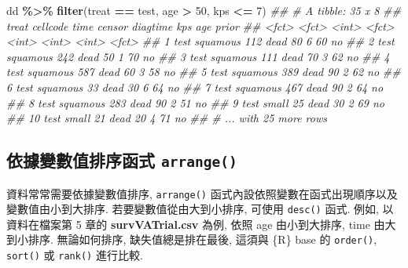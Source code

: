 \documentclass[
]{book}
\newenvironment{Shaded}{\begin{snugshade}}{\end{snugshade}}
\newcommand{\CommentTok}[1]{\textcolor[rgb]{0.56,0.35,0.01}{\textit{#1}}}
\newcommand{\DecValTok}[1]{\textcolor[rgb]{0.00,0.00,0.81}{#1}}
\newcommand{\KeywordTok}[1]{\textcolor[rgb]{0.13,0.29,0.53}{\textbf{#1}}}
\newcommand{\NormalTok}[1]{#1}
\newcommand{\OperatorTok}[1]{\textcolor[rgb]{0.81,0.36,0.00}{\textbf{#1}}}
\newcommand{\StringTok}[1]{\textcolor[rgb]{0.31,0.60,0.02}{#1}}
\begin{document}
\begin{Shaded}
\begin{Highlighting}[]
\NormalTok{dd }\OperatorTok{\%\textgreater{}\%}\StringTok{ }
\StringTok{  }\KeywordTok{filter}\NormalTok{(treat }\OperatorTok{==}\StringTok{ \textquotesingle{}test\textquotesingle{}}\NormalTok{, age }\OperatorTok{\textgreater{}}\StringTok{ }\DecValTok{50}\NormalTok{, kps }\OperatorTok{\textless{}=}\StringTok{ }\DecValTok{7}\NormalTok{)}
\CommentTok{\#\# \# A tibble: 35 x 8}
\CommentTok{\#\#    treat cellcode  time censor diagtime   kps   age prior}
\CommentTok{\#\#    \textless{}fct\textgreater{} \textless{}fct\textgreater{}    \textless{}int\textgreater{} \textless{}fct\textgreater{}     \textless{}int\textgreater{} \textless{}int\textgreater{} \textless{}int\textgreater{} \textless{}fct\textgreater{}}
\CommentTok{\#\#  1 test  squamous   112 dead         80     6    60 no   }
\CommentTok{\#\#  2 test  squamous   242 dead         50     1    70 no   }
\CommentTok{\#\#  3 test  squamous   111 dead         70     3    62 no   }
\CommentTok{\#\#  4 test  squamous   587 dead         60     3    58 no   }
\CommentTok{\#\#  5 test  squamous   389 dead         90     2    62 no   }
\CommentTok{\#\#  6 test  squamous    33 dead         30     6    64 no   }
\CommentTok{\#\#  7 test  squamous   467 dead         90     2    64 no   }
\CommentTok{\#\#  8 test  squamous   283 dead         90     2    51 no   }
\CommentTok{\#\#  9 test  small       25 dead         30     2    69 no   }
\CommentTok{\#\# 10 test  small       21 dead         20     4    71 no   }
\CommentTok{\#\# \# ... with 25 more rows}
\end{Highlighting}
\end{Shaded}

\hypertarget{ux4f9dux64daux8b8aux6578ux503cux6392ux5e8fux51fdux5f0f-arrange}{%
\subsection{\texorpdfstring{依據變數值排序函式 \texttt{arrange()}}{依據變數值排序函式 arrange()}}\label{ux4f9dux64daux8b8aux6578ux503cux6392ux5e8fux51fdux5f0f-arrange}}

資料常常需要依據變數值排序,
\texttt{arrange()} 函式內設依照變數在函式出現順序以及變數值由小到大排序.
若要變數值從由大到小排序, 可使用 \texttt{desc()} 函式.
例如, 以資料在檔案第 5 章的 \textbf{survVATrial.csv} 為例,
依照 age 由小到大排序,
time 由大到小排序.
無論如何排序, 缺失值總是排在最後,
這須與 \{R\} base 的 \texttt{order()}, \texttt{sort()} 或 \texttt{rank()} 進行比較.
\end{document}
